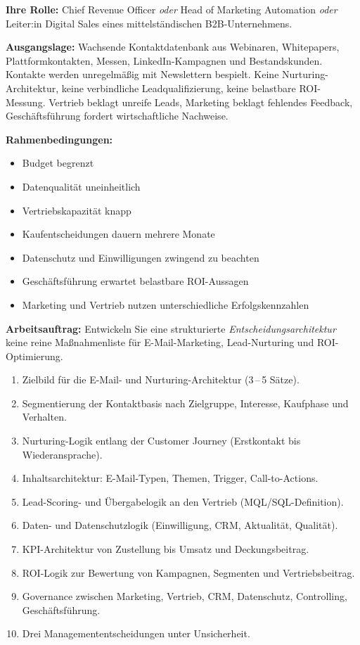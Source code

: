\documentclass[11pt,a4paper,oneside]{article}
\begin{document}
\begin{infobox}
\textbf{Ihre Rolle:} Chief Revenue Officer \emph{oder} Head of Marketing Automation \emph{oder} Leiter:in Digital Sales eines mittelständischen B2B-Unternehmens.

\smallskip
\textbf{Ausgangslage:} Wachsende Kontaktdatenbank aus Webinaren, Whitepapers, Plattformkontakten, Messen, LinkedIn-Kampagnen und Bestandskunden. Kontakte werden unregelmäßig mit Newslettern bespielt. Keine Nurturing-Architektur, keine verbindliche Leadqualifizierung, keine belastbare ROI-Messung. Vertrieb beklagt unreife Leads, Marketing beklagt fehlendes Feedback, Geschäftsführung fordert wirtschaftliche Nachweise.

\smallskip
\textbf{Rahmenbedingungen:}
\begin{itemize}
  \item Budget begrenzt
  \item Datenqualität uneinheitlich
  \item Vertriebskapazität knapp
  \item Kaufentscheidungen dauern mehrere Monate
  \item Datenschutz und Einwilligungen zwingend zu beachten
  \item Geschäftsführung erwartet belastbare ROI-Aussagen
  \item Marketing und Vertrieb nutzen unterschiedliche Erfolgskennzahlen
\end{itemize}
\end{infobox}

\noindent\textbf{Arbeitsauftrag:} Entwickeln Sie eine strukturierte \emph{Entscheidungsarchitektur} \textendash{} keine reine Maßnahmenliste \textendash{} für E-Mail-Marketing, Lead-Nurturing und ROI-Optimierung.

\begin{enumerate}
  \item Zielbild für die E-Mail- und Nurturing-Architektur (3\,--\,5 Sätze).
  \item Segmentierung der Kontaktbasis nach Zielgruppe, Interesse, Kaufphase und Verhalten.
  \item Nurturing-Logik entlang der Customer Journey (Erstkontakt bis Wiederansprache).
  \item Inhaltsarchitektur: E-Mail-Typen, Themen, Trigger, Call-to-Actions.
  \item Lead-Scoring- und Übergabelogik an den Vertrieb (MQL/SQL-Definition).
  \item Daten- und Datenschutzlogik (Einwilligung, CRM, Aktualität, Qualität).
  \item KPI-Architektur von Zustellung bis Umsatz und Deckungsbeitrag.
  \item ROI-Logik zur Bewertung von Kampagnen, Segmenten und Vertriebsbeitrag.
  \item Governance zwischen Marketing, Vertrieb, CRM, Datenschutz, Controlling, Geschäftsführung.
  \item Drei Managemententscheidungen unter Unsicherheit.
\end{enumerate}
\end{document}

